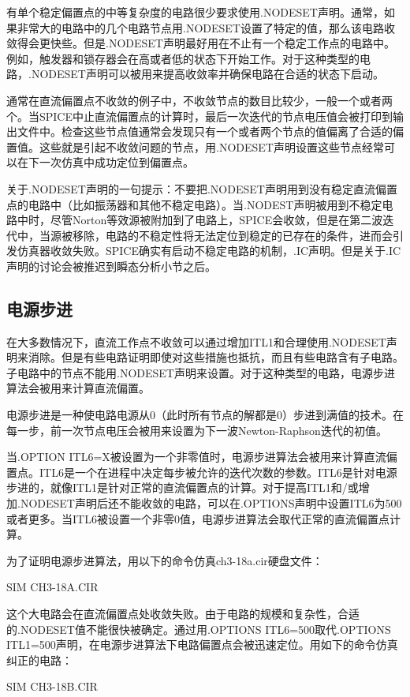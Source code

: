 有单个稳定偏置点的中等复杂度的电路很少要求使用.NODESET声明。通常，如果非常大的电路中的几个电路节点用.NODESET设置了特定的值，那么该电路收敛得会更快些。但是.NODESET声明最好用在不止有一个稳定工作点的电路中。例如，触发器和锁存器会在高或者低的状态下开始工作。对于这种类型的电路，.NODESET声明可以被用来提高收敛率并确保电路在合适的状态下启动。

通常在直流偏置点不收敛的例子中，不收敛节点的数目比较少，一般一个或者两个。当SPICE中止直流偏置点的计算时，最后一次迭代的节点电压值会被打印到输出文件中。检查这些节点值通常会发现只有一个或者两个节点的值偏离了合适的偏置值。这些就是引起不收敛问题的节点，用.NODESET声明设置这些节点经常可以在下一次仿真中成功定位到偏置点。

关于.NODESET声明的一句提示：不要把.NODESET声明用到没有稳定直流偏置点的电路中（比如振荡器和其他不稳定电路）。当.NODEST声明被用到不稳定电路中时，尽管Norton等效源被附加到了电路上，SPICE会收敛，但是在第二波迭代中，当源被移除，电路的不稳定性将无法定位到稳定的已存在的条件，进而会引发仿真器收敛失败。SPICE确实有启动不稳定电路的机制，.IC声明。但是关于.IC声明的讨论会被推迟到瞬态分析小节之后。

\subsection{电源步进}
在大多数情况下，直流工作点不收敛可以通过增加ITL1和合理使用.NODESET声明来消除。但是有些电路证明即使对这些措施也抵抗，而且有些电路含有子电路。子电路中的节点不能用.NODESET声明来设置。对于这种类型的电路，电源步进算法会被用来计算直流偏置。

电源步进是一种使电路电源从0（此时所有节点的解都是0）步进到满值的技术。在每一步，前一次节点电压会被用来设置为下一波Newton-Raphson迭代的初值。

当.OPTION ITL6=X被设置为一个非零值时，电源步进算法会被用来计算直流偏置点。ITL6是一个在进程中决定每步被允许的迭代次数的参数。ITL6是针对电源步进的，就像ITL1是针对正常的直流偏置点的计算。对于提高ITL1和/或增加.NODESET声明后还不能收敛的电路，可以在.OPTIONS声明中设置ITL6为500或者更多。当ITL6被设置一个非零0值，电源步进算法会取代正常的直流偏置点计算。

为了证明电源步进算法，用以下的命令仿真ch3-18a.cir硬盘文件：

SIM CH3-18A.CIR

这个大电路会在直流偏置点处收敛失败。由于电路的规模和复杂性，合适的.NODESET值不能很快被确定。通过用.OPTIONS ITL6=500取代.OPTIONS ITL1=500声明，在电源步进算法下电路偏置点会被迅速定位。用如下的命令仿真纠正的电路：

SIM CH3-18B.CIR

